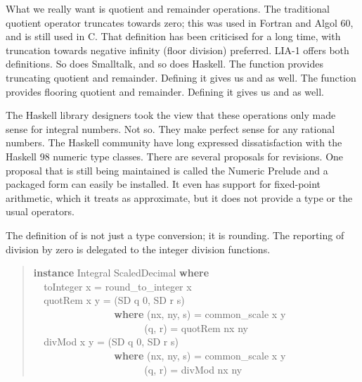 \documentclass[prodmode,acmtoplas]{acmsmall}
\begin{document}
What we really want is quotient and remainder operations.
The traditional quotient operator truncates towards zero; this was
used in Fortran and Algol 60, and is still used in C.  That
definition has been criticised for a long time, with truncation
towards negative infinity (floor division) preferred.  LIA-1
offers both definitions.  So does Smalltalk, and so does Haskell.
The  function provides truncating quotient and remainder.
Defining it gives us  and  as well.
The  function provides flooring quotient and remainder.
Defining it gives us  and  as well.

The Haskell library designers took the view that these operations
only made sense for integral numbers.  Not so.  They make perfect
sense for any rational numbers.  The Haskell community have long
expressed dissatisfaction with the Haskell 98 numeric type classes.
There are several proposals \cite{MATH} for revisions.  One proposal that
is still being maintained is called the Numeric Prelude \cite{NPHW} and
a packaged form \cite{NPHP} can easily be installed.  It even has support
for fixed-point arithmetic, which it treats as approximate, but it does
not provide a type or the usual operators.

The definition of 
is not just a type conversion; it is rounding.  The reporting of
division by zero is delegated to the integer division functions.

\begin{quote}
\begin{tabbing}
\sffamily \textbf{instance} Integral ScaledDecimal \textbf{where}\\
\verb|  |\sffamily  toInteger x = round\_to\_integer x\\
\verb|  |\sffamily  quotRem x y = (SD q 0, SD r s)\\
\verb|                |\sffamily                \textbf{where} (nx, ny, s) = common\_scale x y\\
\verb|                      |\sffamily                      (q, r)      = quotRem nx ny\\
\verb|  |\sffamily  divMod x y  = (SD q 0, SD r s)\\
\verb|                |\sffamily                \textbf{where} (nx, ny, s) = common\_scale x y\\
\verb|                      |\sffamily                      (q, r)      = divMod nx ny
\end{tabbing}
\end{quote}
\end{document}
